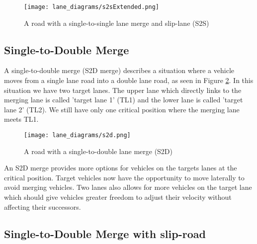 \begin{figure}[htb]{}
\texttt{[image: lane\_diagrams/s2sExtended.png]}
\caption{A road with a single-to-single lane merge and slip-lane (S2S)}
\label{fig:S2SMergeExtended}
\end{figure}


\subsection{Single-to-Double Merge}
\label{subsec:Single-to-Double Merge}
A single-to-double merge (S2D merge) describes a situation where a vehicle moves from a single lane road into a double lane road, as seen in Figure \ref{fig:S2DMerge}. In this situation we have two target lanes. The upper lane which directly links to the merging lane is called 'target lane 1' (TL1) and the lower lane is called 'target lane 2' (TL2). We still have only one critical position where the merging lane meets TL1.

\begin{figure}[htb]
\texttt{[image: lane\_diagrams/s2d.png]}
\caption{A road with a single-to-double lane merge (S2D)}
\label{fig:S2DMerge}
\end{figure}

An S2D merge provides more options for vehicles on the targets lanes at the critical position. Target vehicles now have the opportunity to move laterally to avoid merging vehicles. Two lanes also allows for more vehicles on the target lane which should give vehicles greater freedom to adjust their velocity without affecting their successors.

\subsection{Single-to-Double Merge with slip-road}
\label{subsec:Single-to-Double Merge with slip-road}


